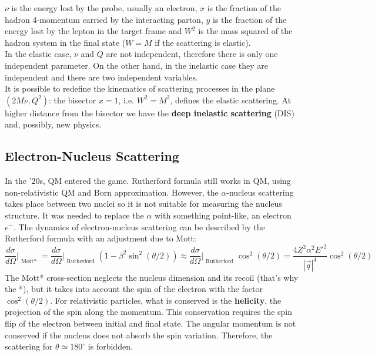 \documentclass[10.75pt,a4paper,openright,bottom=2cm]{article}
\begin{document}
\noindent
$\nu$ is the energy lost by the probe, usually an electron, $x$ is the fraction of the hadron 4-momentum carried by the interacting parton, $y$ is the fraction of the energy lost by the lepton in the target frame and $W^2$ is the mass squared of the hadron system in the final state ($W=M$ if the scattering is elastic).\\
In the elastic case, $\nu$ and $Q$ are not independent, therefore there is only one independent parameter. On the other hand, in the inelastic case they are independent and there are two independent variables.\\
It is possible to redefine the kinematics of scattering processes in the plane $(2M\nu,Q^2)$: the bisector $x=1$, i.e. $W^2=M^2$, defines the elastic scattering. At higher distance from the bisector we have the \textbf{deep inelastic scattering} (DIS) and, possibly, new physics.
\subsection{Electron-Nucleus Scattering}
In the '20s, QM entered the game. Rutherford formula still works in QM, using non-relativistic QM and Born approximation. However, the $\alpha$-nucleus scattering takes place between two nuclei so it is not suitable for measuring the nucleus structure. It was needed to replace the $\alpha$ with something point-like, an electron $e^-$. The dynamics of electron-nucleus scattering can be described by the Rutherford formula with an adjustment due to Mott:
\[
\frac{d\sigma}{d\Omega}\Bigr|_{\substack{\text{Mott*}}}=\frac{d\sigma}{d\Omega}\Bigr|_{\substack{\text{Rutherford}}}\left(1-\beta^2\sin^2(\theta/2)\right)\approx\frac{d\sigma}{d\Omega}\Bigr|_{\substack{\text{Rutherford}}}\cos^2(\theta/2)=\frac{4Z^2\alpha^2E'^2}{|\Vec{q}|^4}\cos^2(\theta/2)
\]
The Mott* cross-section neglects the nucleus dimension and its recoil (that's why the *), but it takes into account the spin of the electron with the factor $\cos^2(\theta/2)$. For relativistic particles, what is conserved is the \textbf{helicity}, the projection of the spin along the momentum. This conservation requires the spin flip of the electron between initial and final state. The angular momentum is not conserved if the nucleus does not absorb the spin variation. Therefore, the scattering for $\theta\simeq180^\circ$ is forbidden.
\end{document}
